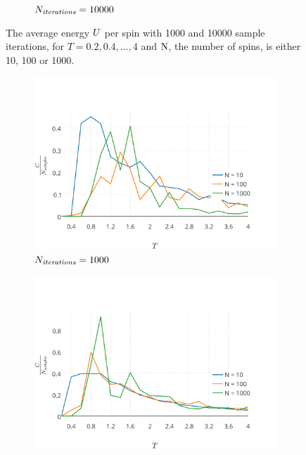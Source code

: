 \begin{figure}
\begin{subfigure}{\columnwidth}
			\caption{$N_\textit{iterations} = 10000$}
			\label{fig:results:1D:U:10000}
		\end{subfigure}	
		\caption{The average energy $U$ per spin with  1000 and  10000 sample iterations, for $T = 0.2, 0.4, \dotsc, 4$ and $\mathrm{N}$, the number of spins, is either 10, 100 or 1000.}
		\label{fig:results:1D:U}
	\end{figure}

	\begin{figure}
		\centering
		\begin{subfigure}{\columnwidth}
			\centering
			\includegraphics[width=\textwidth, keepaspectratio=true]{img/1D/1DspecificHeatN1000.pdf}
			\caption{$N_\textit{iterations} = 1000$}
			\label{fig:results:1D:C:1000}
		\end{subfigure}
		\begin{subfigure}{\columnwidth}
			\centering
			\includegraphics[width=\textwidth, keepaspectratio=true]{img/1D/1DspecificHeatN10000.pdf}

\end{subfigure}
\end{figure}
